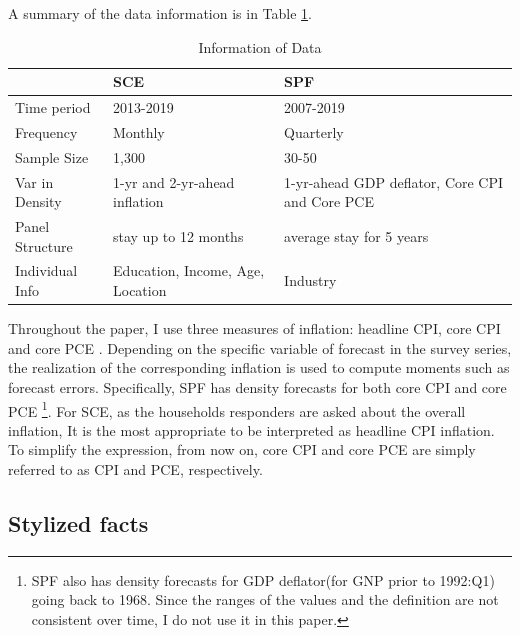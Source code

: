 \documentclass[12pt]{article}
\begin{document}
	A summary of the data information is in Table \ref{DataInfo}. 

	\begin{table}[ht]
		\caption{Information of Data}
		\label{DataInfo}
		\begin{tabularx}{\textwidth}{|X|X|X|}
			\hline 
			& SCE & SPF        \\
			\hline 
			Time period                                    & 2013-2019                           &
			 2007-2019             \\
			 \hline 
			Frequency                                      & Monthly                                 & Quarterly                \\
			\hline 
			Sample Size                                    & 1,300                                   & 30-50                    \\
			\hline 
			Var in Density                       & 1-yr and 2-yr-ahead inflation          & 1-yr-ahead GDP deflator, Core CPI and Core PCE         \\
			\hline 
			Panel Structure                               & stay up to 12 months                    & average stay for 5 years \\
			\hline 
			Individual Info                        & Education, Income, Age, Location        & Industry    \\
			\hline 
		\end{tabularx}
	\end{table}
	
	Throughout the paper, I use three measures of inflation: headline CPI, core CPI and core PCE . Depending on the specific variable of forecast in the survey series, the realization of the corresponding inflation is used to compute moments such as forecast errors. Specifically, SPF has density forecasts for both core CPI and core PCE \footnote{SPF also  has density forecasts for GDP deflator(for GNP prior to 1992:Q1) going back to 1968. Since the ranges of the values and the definition are not consistent over time, I do not use it in this paper.}. For SCE, as the households responders are asked about the overall inflation, It is the most appropriate to be interpreted as  headline CPI inflation. To simplify the expression, from now on, core CPI and core PCE are simply referred to as CPI and PCE, respectively. 

	\subsection{Stylized facts}
	
\end{document}
